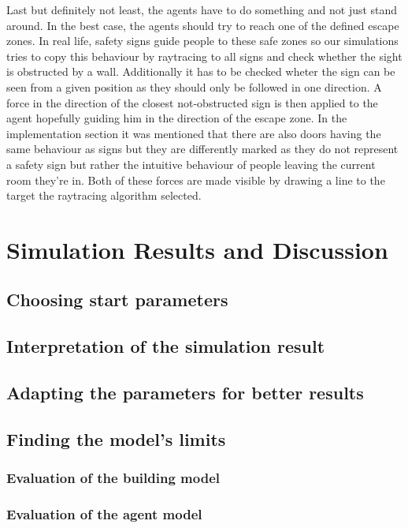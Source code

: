 \documentclass[11pt]{article}
\begin{document}
\begin{itemize}
    Last but definitely not least, the agents have to do something and not just stand around. In the best case, the agents should try to reach one of the defined escape zones. In real life, safety signs guide people to these safe zones so our simulations tries to copy this behaviour by raytracing to all signs and check whether the sight is obstructed by a wall. Additionally it has to be checked wheter the sign can be seen from a given position as they should only be followed in one direction. A force in the direction of the closest not-obstructed sign is then applied to the agent hopefully guiding him in the direction of the escape zone. In the implementation section it was mentioned that there are also doors having the same behaviour as signs but they are differently marked as they do not represent a safety sign but rather the intuitive behaviour of people leaving the current room they're in. Both of these forces are made visible by drawing a line to the target the raytracing algorithm selected.
\end{itemize}

\section{Simulation Results and Discussion}

\subsection{Choosing start parameters}

\subsection{Interpretation of the simulation result}

\subsection{Adapting the parameters for better results}

\subsection{Finding the model's limits}

\subsubsection{Evaluation of the building model}
\subsubsection{Evaluation of the agent model}
\end{document}
